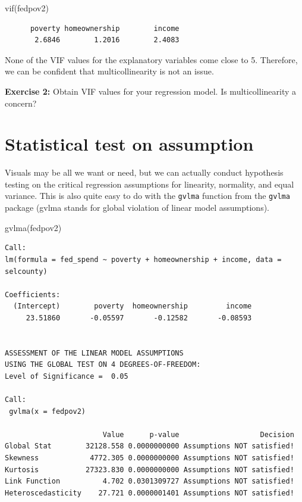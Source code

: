 \documentclass[
]{book}
\makeatletter
\newenvironment{Shaded}{\begin{snugshade}}{\end{snugshade}}
\newcommand{\FunctionTok}[1]{\textcolor[rgb]{0,0,0}{#1}}
\newcommand{\NormalTok}[1]{#1}
\newenvironment{kframe}{%
\medskip{}
\setlength{\fboxsep}{.8em}
 \def\at@end@of@kframe{}%
 \ifinner\ifhmode%
  \def\at@end@of@kframe{\end{minipage}}%
  \begin{minipage}{\columnwidth}%
 \fi\fi%
 \def\FrameCommand##1{\hskip\@totalleftmargin \hskip-\fboxsep
 \colorbox{shadecolor}{##1}\hskip-\fboxsep
     \hskip-\linewidth \hskip-\@totalleftmargin \hskip\columnwidth}%
 \MakeFramed {\advance\hsize-\width
   \@totalleftmargin\z@ \linewidth\hsize
   \@setminipage}}%
 {\par\unskip\endMakeFramed%
 \at@end@of@kframe}
\renewenvironment{Shaded}{\begin{kframe}}{\end{kframe}}
\newenvironment{rmdblock}[1]
  {\begin{shaded*}
  }
  {\end{shaded*}
  }
\newenvironment{learncheck}
  {\begin{rmdblock}{warning}}
  {\end{rmdblock}}
\makeatother
\begin{document}
\begin{Shaded}
\begin{Highlighting}[]
\FunctionTok{vif}\NormalTok{(fedpov2)}
\end{Highlighting}
\end{Shaded}

\begin{verbatim}
      poverty homeownership        income 
       2.6846        1.2016        2.4083 
\end{verbatim}

None of the VIF values for the explanatory variables come close to 5. Therefore, we can be confident that multicollinearity is not an issue.

\begin{learncheck}
\textbf{Exercise 2:} Obtain VIF values for your regression model. Is
multicollinearity a concern?
\end{learncheck}

\hypertarget{statistical-test-on-assumption}{%
\section{Statistical test on assumption}\label{statistical-test-on-assumption}}

Visuals may be all we want or need, but we can actually conduct hypothesis testing on the critical regression assumptions for linearity, normality, and equal variance. This is also quite easy to do with the \texttt{gvlma} function from the \texttt{gvlma} package (gvlma stands for global violation of linear model assumptions).

\begin{Shaded}
\begin{Highlighting}[]
\FunctionTok{gvlma}\NormalTok{(fedpov2)}
\end{Highlighting}
\end{Shaded}

\begin{verbatim}
Call:
lm(formula = fed_spend ~ poverty + homeownership + income, data = selcounty)

Coefficients:
  (Intercept)        poverty  homeownership         income  
     23.51860       -0.05597       -0.12582       -0.08593  


ASSESSMENT OF THE LINEAR MODEL ASSUMPTIONS
USING THE GLOBAL TEST ON 4 DEGREES-OF-FREEDOM:
Level of Significance =  0.05 

Call:
 gvlma(x = fedpov2) 

                       Value      p-value                   Decision
Global Stat        32128.558 0.0000000000 Assumptions NOT satisfied!
Skewness            4772.305 0.0000000000 Assumptions NOT satisfied!
Kurtosis           27323.830 0.0000000000 Assumptions NOT satisfied!
Link Function          4.702 0.0301309727 Assumptions NOT satisfied!
Heteroscedasticity    27.721 0.0000001401 Assumptions NOT satisfied!
\end{verbatim}
\end{document}
